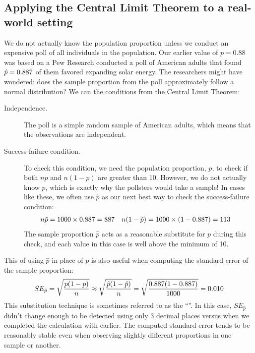 \subsection{Applying the Central Limit Theorem to a real-world setting}

We do not actually know the population proportion
unless we conduct an expensive poll of all individuals
in the population.
Our earlier value of $p = 0.88$ was based on
a Pew Research conducted a poll of \pewsolarpollsize{}
American adults that found
$\hat{p} = 0.887{}$ of them favored
expanding solar energy.
The researchers might have wondered:
does the sample proportion from the poll approximately
follow a normal distribution?
We can the conditions from the Central Limit Theorem:
\begin{description}
\item[Independence.] The poll is a simple random sample of
    American adults, which means that the observations are
    independent.
\item[Success-failure condition.] To check this condition,
    we need the population proportion, $p$, to check if both
    $np$ and $n(1-p)$ are greater than 10.
    However, we do not actually know $p$, which
    is exactly why the pollsters would take a sample!
    In cases like these, we often use $\hat{p}$
    as our next best way to check the success-failure condition:
    \begin{align*}
    n\hat{p}
        &= 1000{} \times 0.887{}
        = 887{}
    &n (1 - \hat{p})
        &= 1000{} \times (1 - 0.887{})
        = 113{}
    \end{align*}
    The sample proportion $\hat{p}$ acts as
    a reasonable substitute for $p$ during this check,
    and each value in this case is well above the minimum of 10.
\end{description}

This  of using $\hat{p}$ in
place of $p$ is also useful when computing the standard error
of the sample proportion:
\begin{align*}
SE_{\hat{p}}
    = \sqrt{\frac{p (1 - p)}{n}}
    \approx \sqrt{\frac{\hat{p} (1 - \hat{p})}{n}}
    = \sqrt{\frac{0.887{}
        (1 - 0.887{})}{1000{}}}
    = 0.010{}
\end{align*}
This substitution technique is sometimes
referred to as the ``''.
In this case, $SE_{\hat{p}}$ didn't change enough to
be detected using only 3 decimal places
versus when we completed the calculation with
\pewsolarparprop{} earlier.
The computed standard error tends to be reasonably stable
even when observing slightly different proportions in one
sample or another.


